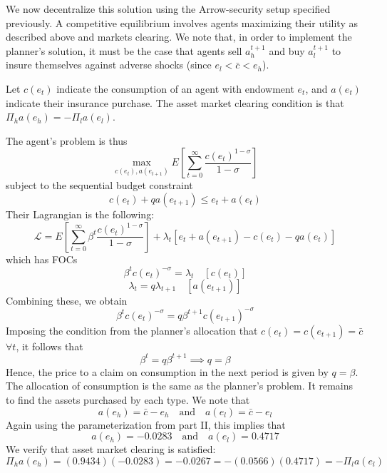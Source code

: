 \documentclass[12pt]{article}
\begin{document}
We now decentralize this solution using the Arrow-security setup specified previously. A competitive equilibrium involves agents maximizing their utility as described above and markets clearing. We note that, in order to implement the planner's solution, it must be the case that agents sell $a_h^{t+1}$ and buy $a_l^{t+1}$ to insure themselves against adverse shocks (since $e_l < \bar{c} < e_h$).

Let $c(e_t)$ indicate the consumption of an agent with endowment $e_t$, and $a(e_t)$ indicate their insurance purchase. The asset market clearing condition is that $\Pi_h a(e_h) = -\Pi_l a(e_l)$.

The agent's problem is thus
\[\max_{c(e_t), a(e_{t+1})} E\left[ \sum_{t=0}^{\infty} \frac{c(e_t)^{1-\sigma}}{1-\sigma}\right]\]
subject to the sequential budget constraint
\[c(e_t) + q a(e_{t+1}) \leq e_t + a(e_t)\]
Their Lagrangian is the following:
\[\mathcal{L} = E\left[\sum_{t=0}^{\infty} \beta^t\frac{c(e_t)^{1-\sigma}}{1-\sigma}\right] + \lambda_t [ e_t + a(e_{t+1}) - c(e_t) - q a(e_t)]\]
which has FOCs
\[\beta^t c(e_t)^{-\sigma} =\lambda_t \quad [c(e_t)]\]
\[\lambda_t = q \lambda_{t+1} \quad [a(e_{t+1})]\]
Combining these, we obtain
\[\beta^t c(e_t)^{-\sigma} = q \beta^{t+1} c(e_{t+1})^{-\sigma}\]
Imposing the condition from the planner's allocation that $c(e_t) = c(e_{t+1}) = \bar{c}$ $\forall t$, it follows that
\[\beta^t = q \beta^{t+1} \implies q = \beta\]
Hence, the price to a claim on consumption in the next period is given by $q= \beta$. The allocation of consumption is the same as the planner's problem. It remains to find the assets purchased by each type. We note that
\[a(e_h) = \bar{c} - e_h \quad \text{and} \quad a(e_l) = \bar{c} - e_l\]
Again using the parameterization from part II, this implies that
\[a(e_h) = -0.0283 \quad \text{and} \quad a(e_l) = 0.4717\]
We verify that asset market clearing is satisfied:
\[\Pi_h a(e_h) =(0.9434) (-0.0283) = -0.0267 = -(0.0566)(0.4717) = -\Pi_l a(e_l) \]
\end{document}
